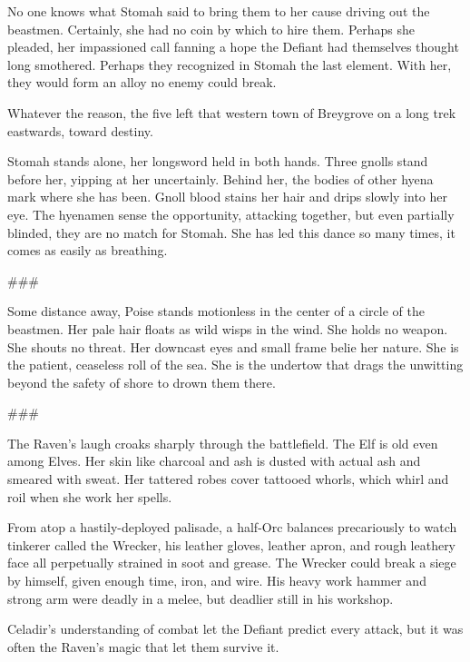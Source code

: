No one knows what Stomah said to bring them to her cause driving out the beastmen.
Certainly, she had no coin by which to hire them.
Perhaps she pleaded, her impassioned call fanning a hope the Defiant had themselves
  thought long smothered.
Perhaps they recognized in Stomah the last element.
With her, they would form an alloy no enemy could break.

Whatever the reason, the five left that western town of Breygrove on a long trek eastwards, toward
destiny.

\hrulefill

Stomah stands alone, her longsword held in both hands.
Three gnolls stand before her, yipping at her uncertainly.
Behind her, the bodies of other hyena mark where she has been.
Gnoll blood stains her hair and drips slowly into her eye.
The hyenamen sense the opportunity, attacking together, but even partially blinded, they are no
  match for Stomah.
She has led this dance so many times, it comes as easily as breathing.

###

Some distance away, Poise stands motionless in the center of a circle of the beastmen.
Her pale hair floats as wild wisps in the wind.
She holds no weapon.
She shouts no threat.
Her downcast eyes and small frame belie her nature.
She is the patient, ceaseless roll of the sea.
She is the undertow that drags the unwitting beyond the safety of shore to drown them there.

###

The Raven's laugh croaks sharply through the battlefield.
The Elf is old even among Elves.
Her skin like charcoal and ash is dusted with actual ash and smeared with sweat.
Her tattered robes cover tattooed whorls, which whirl and roil when she work her spells.

From atop a hastily-deployed palisade, a half-Orc balances precariously to watch
tinkerer called the Wrecker, his leather gloves, leather apron, and rough leathery face all
perpetually strained in soot and grease.
The Wrecker could break a siege by himself, given enough time, iron, and wire.
His heavy work hammer and strong arm were deadly in a melee, but deadlier still in his workshop.









Celadir's understanding of combat let the Defiant predict every attack,
but it was often the Raven's magic that let them survive it.


